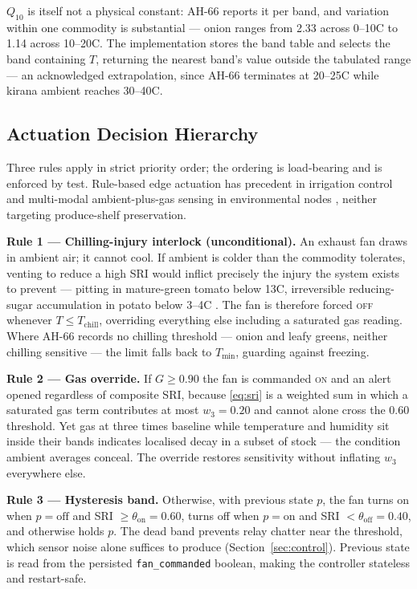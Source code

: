 \documentclass[conference]{IEEEtran}
\begin{document}
$Q_{10}$ is itself not a physical constant: AH-66 \cite{ah66} reports it
per band, and variation within one commodity is substantial --- onion
ranges from 2.33 across 0--10\textdegree C to 1.14 across
10--20\textdegree C. The implementation stores the band table and selects
the band containing $T$, returning the nearest band's value outside the
tabulated range --- an acknowledged extrapolation, since AH-66 terminates
at 20--25\textdegree C while kirana ambient reaches 30--40\textdegree C.

\subsection{Actuation Decision Hierarchy}
\label{sec:hierarchy}

Three rules apply in strict priority order; the ordering is load-bearing
and is enforced by test. Rule-based edge actuation has precedent in
irrigation control \cite{munir2021} and multi-modal ambient-plus-gas
sensing in environmental nodes \cite{wiese2025}, neither targeting
produce-shelf preservation.

\textbf{Rule 1 --- Chilling-injury interlock (unconditional).} An exhaust
fan draws in ambient air; it cannot cool. If ambient is colder than the
commodity tolerates, venting to reduce a high SRI would inflict precisely
the injury the system exists to prevent --- pitting in mature-green tomato
below 13\textdegree C, irreversible reducing-sugar accumulation in potato
below 3--4\textdegree C \cite{ah66}. The fan is therefore forced \textsc{off} whenever
$T \le T_{\text{chill}}$, overriding everything else including a saturated
gas reading. Where AH-66 records no chilling threshold --- onion and leafy
greens, neither chilling sensitive --- the limit falls back to $T_{\min}$,
guarding against freezing.

\textbf{Rule 2 --- Gas override.} If $G \ge 0.90$ the fan is commanded
\textsc{on} and an alert opened regardless of composite SRI, because
\eqref{eq:sri} is a weighted sum in which a saturated gas term contributes
at most $w_3 = 0.20$ and cannot alone cross the $0.60$ threshold. Yet gas
at three times baseline while temperature and humidity sit inside their
bands indicates localised decay in a subset of stock --- the condition
ambient averages conceal. The override restores sensitivity without
inflating $w_3$ everywhere else.

\textbf{Rule 3 --- Hysteresis band.} Otherwise, with previous state $p$,
the fan turns on when $p = \mathrm{off}$ and SRI $\ge \theta_{\text{on}} =
0.60$, turns off when $p = \mathrm{on}$ and SRI $< \theta_{\text{off}} =
0.40$, and otherwise holds $p$. The dead band prevents relay chatter near
the threshold, which sensor noise alone suffices to produce
(Section~\ref{sec:control}). Previous state is read from the persisted
\texttt{fan\_commanded} boolean, making the controller stateless and
restart-safe.
\end{document}
